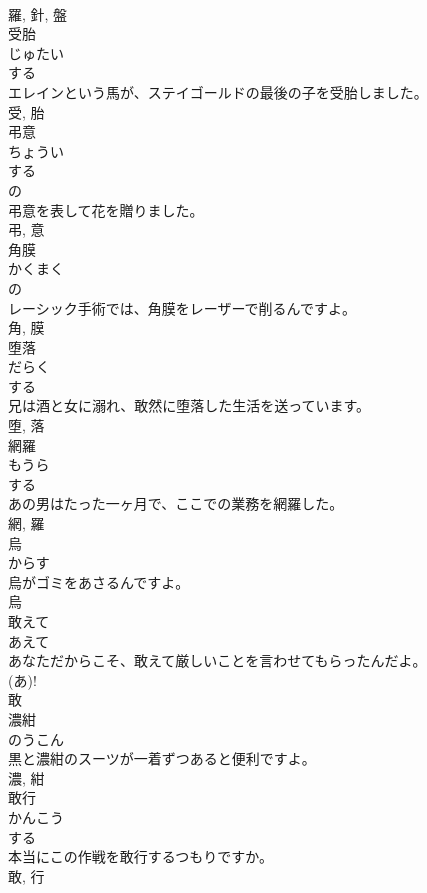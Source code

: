 \documentclass[8pt]{extreport}
\begin{document}
\begin{CJK}{UTF8}{min}
\\	羅, 針, 盤	
\\	受胎	
\\	じゅたい	
\\	する 
\\	エレインという馬が、ステイゴールドの最後の子を受胎しました。	
\\	受, 胎	
\\	弔意	
\\	ちょうい	
\\	する 
\\	の 
\\	弔意を表して花を贈りました。	
\\	弔, 意	
\\	角膜	
\\	かくまく	
\\	の 
\\	レーシック手術では、角膜をレーザーで削るんですよ。	
\\	角, 膜	
\\	堕落	
\\	だらく	
\\	する 
\\	兄は酒と女に溺れ、敢然に堕落した生活を送っています。	
\\	堕, 落	
\\	網羅	
\\	もうら	
\\	する 
\\	あの男はたった一ヶ月で、ここでの業務を網羅した。	
\\	網, 羅	
\\	烏	
\\	からす	
\\	烏がゴミをあさるんですよ。	
\\	烏	
\\	敢えて	
\\	あえて	
\\	あなただからこそ、敢えて厳しいことを言わせてもらったんだよ。	
\\	(あ)!
\\	敢	
\\	濃紺	
\\	のうこん	
\\	黒と濃紺のスーツが一着ずつあると便利ですよ。	
\\	濃, 紺	
\\	敢行	
\\	かんこう	
\\	する 
\\	本当にこの作戦を敢行するつもりですか。	
\\	敢, 行	

\end{CJK}
\end{document}
